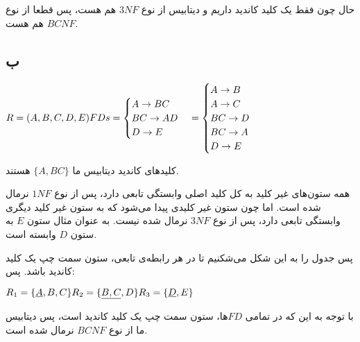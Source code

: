 حال چون فقط یک کلید کاندید داریم و دیتابیس از نوع $3NF$ هم هست، پس قطعا از نوع $BCNF$ هم هست.





\pagebreak


\subsection*{ب}

\setLTR
$
R = (A,B,C,D,E) \\
FDs=\begin{cases}
	A\rightarrow BC \\
	BC \rightarrow AD \\
	D \rightarrow E
\end{cases} = \begin{cases}
A\rightarrow B \\
A\rightarrow C \\
BC \rightarrow D \\
BC \rightarrow A \\
D \rightarrow E
\end{cases}
$
\setRTL

کلیدهای کاندید دیتابیس ما 
$\{A,BC\}$
هستند.

همه ستون‌های غیر کلید به کل کلید اصلی وابستگی تابعی دارد، پس از نوع $1NF$ نرمال شده است. اما چون ستون غیر کلیدی پیدا می‌شود که به ستون غیر کلید دیگری وابستگی تابعی دارد، پس از نوع $3NF$ نرمال شده نیست. به عنوان مثال ستون $E$ به ستون $D$ وابسته است.

پس جدول را به این شکل می‌شکنیم تا در هر رابطه‌ی تابعی، ستون سمت چپ یک کلید کاندید باشد. پس:

\setLTR
$
R_1 = \{\underline{A},B,C\} \\ \\
R_2 = \{\underline{B,C},D\} \\ \\
R_3 = \{\underline{D},E\} \\ 
$
\setRTL

با توجه به این که در تمامی $FD$ها، ستون سمت چپ یک کلید کاندید است، پس دیتابیس ما از نوع 
$BCNF$
نرمال شده است.















